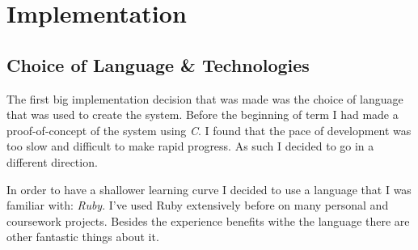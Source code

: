 \chapter{Implementation}

\section{Choice of Language \& Technologies}

The first big implementation decision that was made was the choice of language that was used to create the system. Before the beginning of term I had made a proof-of-concept of the system using \emph{C}. I found that the pace of development was too slow and difficult to make rapid progress. As such I decided to go in a different direction.

In order to have a shallower learning curve I decided to use a language that I was familiar with: \emph{Ruby}. I've used Ruby extensively before on many personal and coursework projects. Besides the experience benefits withe the language there are other fantastic things about it.

